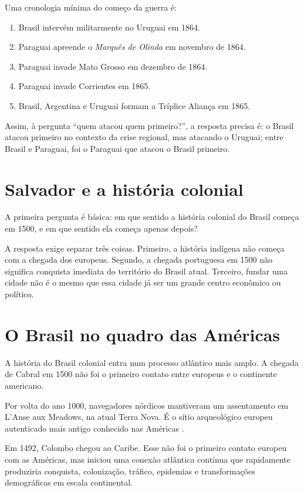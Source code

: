 Uma cronologia mínima do começo da guerra é:

\begin{enumerate}
\item Brasil intervém militarmente no Uruguai
em 1864.
\item Paraguai apreende o \emph{Marquês de
Olinda} em novembro de 1864.
\item Paraguai invade Mato Grosso em dezembro
de 1864.
\item Paraguai invade Corrientes em 1865.
\item Brasil, Argentina e Uruguai formam a
Tríplice Aliança em 1865.
\end{enumerate}

Assim, à pergunta ``quem atacou quem
primeiro?'', a resposta precisa é: o Brasil
atacou primeiro no contexto da crise regional,
mas atacando o Uruguai; entre Brasil e
Paraguai, foi o Paraguai que atacou o Brasil
primeiro.


\section{Salvador e a história colonial}
\label{section-salvador-historia-colonial}

A primeira pergunta é básica: em que
sentido a história colonial do
Brasil começa em 1500, e em que sentido ela
começa apenas depois?

A resposta exige separar três coisas.
Primeiro, a história indígena não começa
com a chegada dos europeus. Segundo, a
chegada portuguesa em 1500 não significa
conquista imediata do território do Brasil
atual. Terceiro, fundar uma cidade
não é o mesmo que essa cidade já ser um
grande centro econômico ou político.


\section{O Brasil no quadro das Américas}
\label{section-brasil-quadro-americas}

A história do Brasil colonial entra num
processo atlântico mais amplo. A chegada de
Cabral em 1500 não foi o primeiro contato
entre europeus e o continente americano.

Por volta do ano 1000, navegadores nórdicos
mantiveram um assentamento em L'Anse aux
Meadows, na atual Terra Nova. É o sítio
arqueológico europeu autenticado mais antigo
conhecido nas Américas
\cite{unesco-lanse-meadows}.

Em 1492, Colombo chegou ao Caribe. Esse não
foi o primeiro contato europeu com as
Américas, mas iniciou uma conexão atlântica
contínua que rapidamente produziria
conquista, colonização, tráfico, epidemias e
transformações demográficas em escala
continental.

